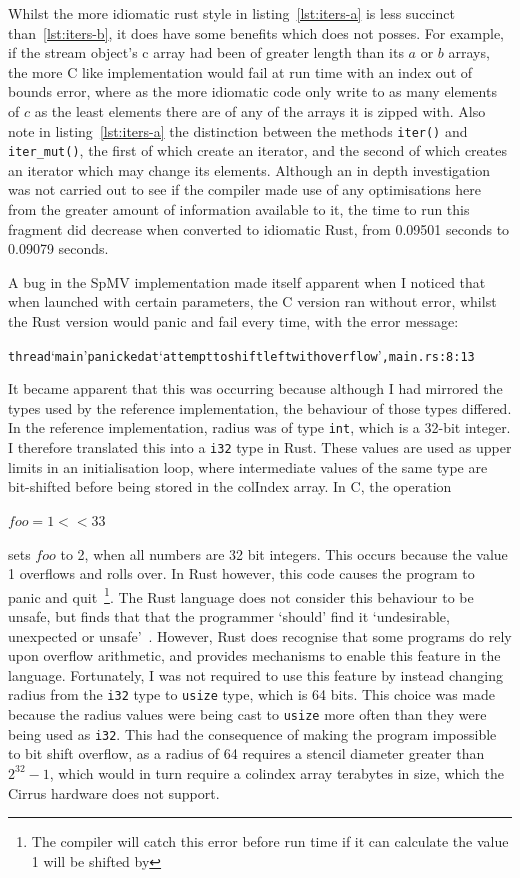 Whilst the more idiomatic rust style in listing~\ref{lst:iters-a} is less succinct than~\ref{lst:iters-b}, it does have some benefits which does not posses. For example, if the stream object's c array had been of greater length than its $a$ or $b$ arrays, the more C like implementation would fail at run time with an index out of bounds error, where as the more idiomatic code only write to as many elements of $c$ as the least elements there are of any of the arrays it is zipped with.
Also note in listing~\ref{lst:iters-a} the distinction between the methods \texttt{iter()} and \texttt{iter\_mut()}, the first of which create an iterator, and the second of which creates an iterator which may change its elements. Although an in depth investigation was not carried out to see if the compiler made use of any optimisations here from the greater amount of information available to it, the time to run this fragment did decrease when converted to idiomatic Rust, from 0.09501 seconds to 0.09079 seconds.

A bug in the SpMV implementation made itself apparent when I noticed that when launched with certain parameters, the C version ran without error, whilst the Rust version would panic and fail every time, with the error message:

\begin{alltt}
\scriptsize
thread `main' panicked at `attempt to shift left with overflow', main.rs:8:13
\end{alltt}

It became apparent that this was occurring because although I had mirrored the types used by the reference implementation, the behaviour of those types differed. In the reference implementation, radius was of type \texttt{int}, which is a 32-bit integer. I therefore translated this into a \texttt{i32} type in Rust. These values are used as upper limits in an initialisation loop, where intermediate values of the same type are bit-shifted before being stored in the colIndex array. In C, the operation

  $foo = 1 << 33$

sets $foo$ to 2, when all numbers are 32 bit integers. This occurs because the value 1 overflows and rolls over. In Rust however, this code causes the program to panic and quit~\footnote{The compiler will catch this error before run time if it can calculate the value 1 will be shifted by}. The Rust language does not consider this behaviour to be unsafe, but finds that that the programmer `should' find it `undesirable, unexpected or unsafe'~\cite{rustunsafe}. However, Rust does recognise that some programs do rely upon overflow arithmetic, and provides mechanisms to enable this feature in the language. Fortunately, I was not required to use this feature by instead changing radius from the \texttt{i32} type to \texttt{usize} type, which is 64 bits. This choice was made because the radius values were being cast to \texttt{usize} more often than they were being used as \texttt{i32}. This had the consequence of making the program impossible to bit shift overflow, as a radius of 64 requires a stencil diameter greater than $2^{32}-1$, which would in turn require a colindex array terabytes in size, which the Cirrus hardware does not support.

